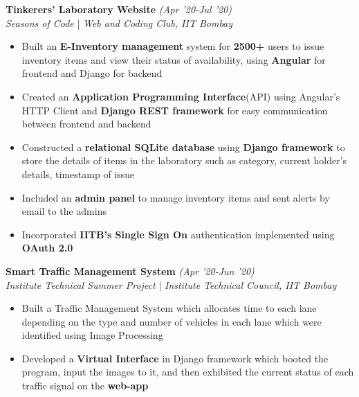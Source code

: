 \documentclass{article}
\begin{document}
\vspace{-6pt}




\large\textbf{Tinkerers' Laboratory Website} \hfill{ \textit{(Apr '20-Jul '20)}}
\large \\ \textit{Seasons of Code} | \textit{Web and Coding Club, IIT Bombay}

\vspace{-6pt}

\begin{itemize}[itemsep=-0.2mm, leftmargin=18pt]
	\item Built an \textbf{E-Inventory management} system for \textbf{2500+} users to issue inventory items and view their status of availability, using \textbf{Angular} for frontend and Django for backend
	\item Created an \textbf{Application Programming Interface}(API) using Angular's HTTP Client and  \textbf{Django REST framework} for easy communication between frontend and backend
	\item Constructed a \textbf{relational SQLite database} using \textbf{Django framework} to store the details of items in the laboratory such as category, current holder's details, timestamp of issue
	\item Included an \textbf{admin panel} to manage inventory items and sent alerts by email to the admins
	\item Incorporated \textbf{IITB's Single Sign On} authentication implemented using \textbf{OAuth 2.0}
\end{itemize}

\raggedright

\vspace{-5pt}





\large\textbf{Smart Traffic Management System} \hfill{ \textit{(Apr '20-Jun '20)}}
\large \\  \textit{Institute Technical Summer Project} | \textit{Institute Technical Council, IIT Bombay}

\vspace{-6pt}

\begin{itemize}[itemsep=-0.2mm, leftmargin=18pt]
	\item Built a Traffic Management System which allocates time to each lane depending on the type and number of vehicles in each lane which were identified using Image Processing
	\item Developed a \textbf{Virtual Interface} in Django framework which booted the program, input the images to it, and then exhibited the current status of each traffic signal on the \textbf{web-app}
\end{itemize}
\end{document}

